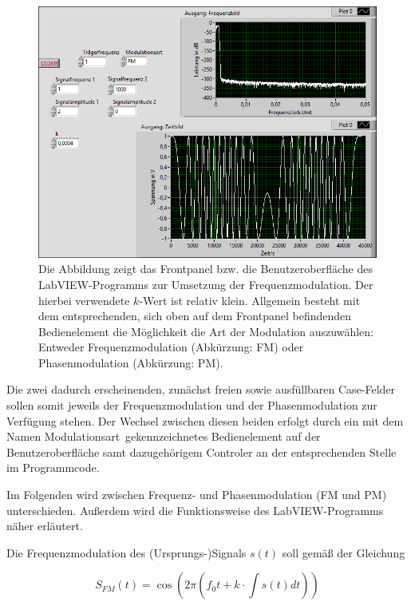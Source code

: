 \documentclass[
a4paper,
12pt,
pagesize,
ngerman
]{scrartcl}
\begin{document}
	\begin{figure}[H]
		\centering
		\includegraphics[width=1.0\textwidth]{EIRE2018Dateien/Tag4/FMPM-Erzeugung/FM-FMPM-Erzeugungp}
		\caption{Die Abbildung zeigt das Frontpanel bzw. die Benutzeroberfläche des LabVIEW-Programms zur Umsetzung der Frequenzmodulation. Der hierbei verwendete $k$-Wert ist relativ klein. Allgemein besteht mit dem entsprechenden, sich oben auf dem Frontpanel befindenden Bedienelement die Möglichkeit die Art der Modulation auszuwählen: Entweder Frequenzmodulation (Abkürzung: FM) oder Phasenmodulation (Abkürzung: PM).}
		\label{FMAusgabekleinesk}
	\end{figure}
	
	\noindent Die zwei dadurch erscheinenden, zunächst freien sowie ausfüllbaren Case-Felder sollen somit jeweils der Frequenzmodulation und der Phasenmodulation zur Verfügung stehen. 
	Der Wechsel zwischen diesen beiden erfolgt durch ein mit dem Namen \glqq Modulationsart\grqq\ gekennzeichnetes Bedienelement auf der Benutzeroberfläche samt dazugehörigem Controler an der entsprechenden Stelle im Programmcode.
	
	Im Folgenden wird zwischen Frequenz- und Phasenmodulation (FM und PM) unterschieden. 
	Außerdem wird die Funktionsweise des LabVIEW-Programms näher erläutert.
	
	Die Frequenzmodulation des (Ursprungs-)Signals $s(t)$ soll gemäß der Gleichung
	
	\begin{equation} \label{FMFormel}
	S_{FM}(t) = \cos (2\pi (f_0 t + k \cdot \int s(t) dt))
	\end{equation}
	
\end{document}
